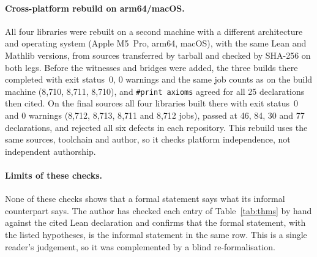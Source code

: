 \documentclass[11pt]{article}
\theoremstyle{definition}
\theoremstyle{remark}
\newcommand{\lean}[1]{\texttt{#1}}
\begin{document}
\paragraph{Cross-platform rebuild on arm64/macOS.} All four libraries
were rebuilt on a second machine with a different architecture and operating system (Apple
M5~Pro, arm64, macOS), with the same Lean and Mathlib versions, from sources transferred by
tarball and checked by SHA-256 on both legs. Before the witnesses and bridges were added, the
three builds there completed with exit status~0, 0 warnings and the same job counts as on the
build machine (8{,}710, 8{,}711, 8{,}710), and \lean{\#print axioms} agreed for all 25
declarations then cited. On the final sources all four libraries built there with exit status~0
and 0 warnings (8{,}712, 8{,}713, 8{,}711 and 8{,}712 jobs),  passed at 46, 84, 30
and 77 declarations, and  rejected all six defects in each repository. This
rebuild uses the same sources, toolchain and author, so it checks platform independence, not
independent authorship.

\paragraph{Limits of these checks.} None of these checks shows that a formal statement says what
its informal counterpart says. The author has checked each entry of Table~\ref{tab:thms} by hand
against the cited Lean declaration and confirms that the formal statement, with the listed
hypotheses, is the informal statement in the same row. This is a single reader's judgement, so it
was complemented by a blind re-formalisation.
\end{document}
